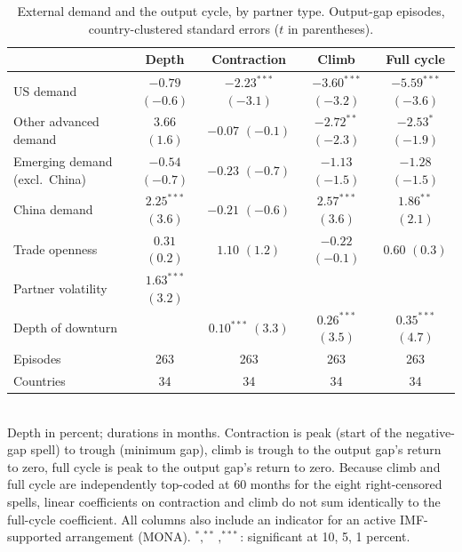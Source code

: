 \begin{table}[t]
\centering
\small
\caption{External demand and the output cycle, by partner type. Output-gap episodes, country-clustered standard errors ($t$ in parentheses).}
\label{tab:main}
\begin{tabular}{lcccc}
\toprule
 & Depth & Contraction & Climb & Full cycle \\
\midrule
US demand & $-0.79$ {\scriptsize$(-0.6)$} & $-2.23^{***}$ {\scriptsize$(-3.1)$} & $-3.60^{***}$ {\scriptsize$(-3.2)$} & $-5.59^{***}$ {\scriptsize$(-3.6)$} \\
Other advanced demand & $3.66$ {\scriptsize$(1.6)$} & $-0.07$ {\scriptsize$(-0.1)$} & $-2.72^{**}$ {\scriptsize$(-2.3)$} & $-2.53^{*}$ {\scriptsize$(-1.9)$} \\
Emerging demand (excl.\ China) & $-0.54$ {\scriptsize$(-0.7)$} & $-0.23$ {\scriptsize$(-0.7)$} & $-1.13$ {\scriptsize$(-1.5)$} & $-1.28$ {\scriptsize$(-1.5)$} \\
China demand & $2.25^{***}$ {\scriptsize$(3.6)$} & $-0.21$ {\scriptsize$(-0.6)$} & $2.57^{***}$ {\scriptsize$(3.6)$} & $1.86^{**}$ {\scriptsize$(2.1)$} \\
Trade openness & $0.31$ {\scriptsize$(0.2)$} & $1.10$ {\scriptsize$(1.2)$} & $-0.22$ {\scriptsize$(-0.1)$} & $0.60$ {\scriptsize$(0.3)$} \\
Partner volatility & $1.63^{***}$ {\scriptsize$(3.2)$} &  &  &  \\
Depth of downturn &  & $0.10^{***}$ {\scriptsize$(3.3)$} & $0.26^{***}$ {\scriptsize$(3.5)$} & $0.35^{***}$ {\scriptsize$(4.7)$} \\
\midrule
Episodes & 263 & 263 & 263 & 263 \\
Countries & 34 & 34 & 34 & 34 \\
\bottomrule\end{tabular}
\\[2pt]\footnotesize{Depth in percent; durations in months. Contraction is peak (start of the negative-gap spell) to trough (minimum gap), climb is trough to the output gap's return to zero, full cycle is peak to the output gap's return to zero. Because climb and full cycle are independently top-coded at 60 months for the eight right-censored spells, linear coefficients on contraction and climb do not sum identically to the full-cycle coefficient. All columns also include an indicator for an active IMF-supported arrangement (MONA). $^{*},^{**},^{***}$: significant at 10, 5, 1 percent.}
\end{table}


